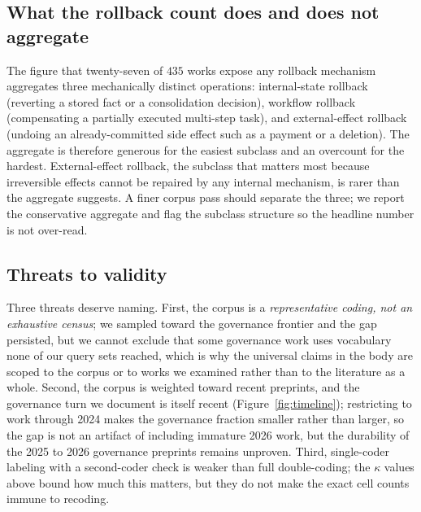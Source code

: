 \subsection{What the rollback count does and does not aggregate}

The figure that twenty-seven of $435$ works expose any rollback mechanism
aggregates three mechanically distinct operations: internal-state rollback
(reverting a stored fact or a consolidation decision), workflow rollback
(compensating a partially executed multi-step task), and external-effect rollback
(undoing an already-committed side effect such as a payment or a deletion). The
aggregate is therefore generous for the easiest subclass and an overcount for the
hardest. External-effect rollback, the subclass that matters most because
irreversible effects cannot be repaired by any internal mechanism, is rarer than
the aggregate suggests. A finer corpus pass should separate the three; we report
the conservative aggregate and flag the subclass structure so the headline number
is not over-read.

\subsection{Threats to validity}

Three threats deserve naming. First, the corpus is a \emph{representative coding,
not an exhaustive census}; we sampled toward the governance frontier and the gap
persisted, but we cannot exclude that some governance work uses vocabulary none of
our query sets reached, which is why the universal claims in the body are scoped
to the corpus or to works we examined rather than to the literature as a whole.
Second, the corpus is weighted toward recent preprints, and the governance turn we
document is itself recent (Figure~\ref{fig:timeline}); restricting to work
through 2024 makes the governance fraction smaller rather than larger, so the gap
is not an artifact of including immature 2026 work, but the durability of the
2025 to 2026 governance preprints remains unproven. Third, single-coder labeling
with a second-coder check is weaker than full double-coding; the $\kappa$ values
above bound how much this matters, but they do not make the exact cell counts
immune to recoding.
